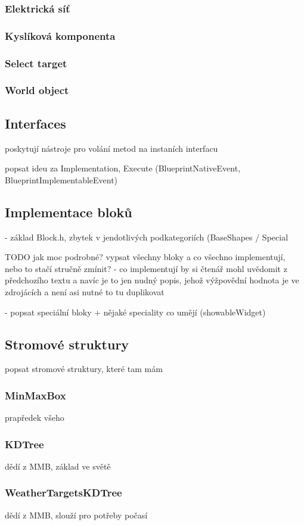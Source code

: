 \subsubsection{Elektrická síť}


\subsubsection{Kyslíková komponenta}


\subsubsection{Select target}


\subsubsection{World object}



\subsection{Interfaces}
poskytují nástroje pro volání metod na instaních interfacu

popsat ideu za Implementation, Execute (BlueprintNativeEvent, BlueprintImplementableEvent)



\subsection{Implementace bloků}
 - základ Block.h, zbytek v jendotlivých podkategoriích (BaseShapes / Special
 
 TODO jak moc podrobné? vypsat všechny bloky a co všechno implementují, nebo to stačí stručně zmínit? - co implementují by si čtenář mohl uvědomit z předchozího textu a navíc je to jen nudný popis, jehož výžpovědní hodnota je ve zdrojácích a není asi nutné to tu duplikovat

- popsat speciální bloky + nějaké speciality co umějí (showableWidget)


\subsection{Stromové struktury}
popsat stromové struktury, které tam mám


\subsubsection{MinMaxBox}

prapředek všeho



\subsubsection{KDTree}

dědí z MMB, základ ve světě


\subsubsection{WeatherTargetsKDTree}

dědí z MMB, slouží pro potřeby počasí